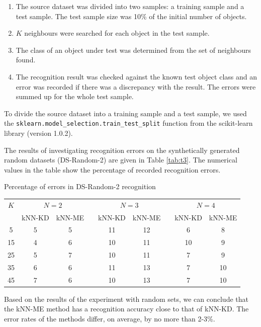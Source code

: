\documentclass[entropy,article,submit,moreauthors,pdftex]{Definitions/mdpi}
\begin{document}
\begin{paracol}{2}
\begin{enumerate}
\item The source dataset was divided into two samples: a training sample and a test sample. The test sample size was 10\% of the initial number of objects.
\item $K$ neighbours were searched for each object in the test sample.
\item The class of an object under test was determined from the set of neighbours found.
\item The recognition result was checked against the known test object class and an error was recorded if there was a discrepancy with the result. The errors were summed up for the whole test sample.
\end{enumerate}

To divide the source dataset into a training sample and a test sample, we used the \texttt{sklearn.model\_selection.train\_test\_split} function from the scikit-learn library (version 1.0.2).

The results of investigating recognition errors on the synthetically generated random datasets (DS-Random-2) are given in Table \ref{tab:t3}. The numerical values in the table show the percentage of recorded recognition errors.

\begin{specialtable}[H] 
  \caption{Percentage of errors in DS-Random-2 recognition}\label{tab:t3}
	\center
	\begin{tabular}{ccccccccc}
\toprule
$K$ & \multicolumn{2}{c}{ $N=2$ } & & \multicolumn{2}{c}{$N=3$} & & \multicolumn{2}{c}{$N=4$} \\
		\noalign{\smallskip} \cline{2-3} \cline{5-6} \cline{8-9} \noalign{\smallskip}
  & kNN-KD & kNN-ME & & kNN-KD & kNN-ME & & kNN-KD & kNN-ME \\
\midrule													
5  & 5 & 5 & & 11 & 12 & & 6 & 8 \\
15 & 4 & 6 & & 10 & 11 & & 10 & 9 \\
25 & 5 & 7 & & 10 & 11 & & 7 & 9 \\
35 & 6 & 6 & & 11 & 13 & & 7 & 10 \\
45 & 7 & 6 & & 10 & 13 & & 7 & 10 \\
\bottomrule
\end{tabular}
\end{specialtable}

Based on the results of the experiment with random sets, we can conclude that the kNN-ME method has a recognition accuracy close to that of kNN-KD. The error rates of the methods differ, on average, by no more than 2-3\%.


\end{paracol}
\end{document}
